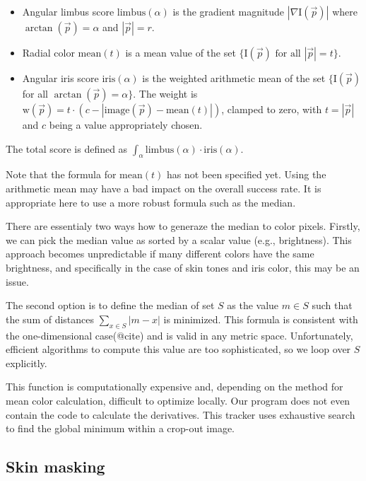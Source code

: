 \begin{itemize}
\item
Angular limbus score $\textrm{limbus}(\alpha)$ is the gradient magnitude $|\nabla \textrm{I}(\vec p)|$ where $\arctan(\vec p) = \alpha$ and $|\vec p| = r$.

\item
Radial color $\textrm{mean}(t)$ is a mean value of the set $\{\textrm{I}(\vec p) \text{ for all } |\vec p| = t \}$.

\item
Angular iris score $\textrm{iris}(\alpha)$ is the weighted arithmetic mean of the set $\{\textrm{I}(\vec p)$ for all $\arctan(\vec p) = \alpha \}$.
The weight is $\textrm{w}(\vec p) = t \cdot (c - |\textrm{image}(\vec p) - \textrm{mean}(t)|)$, clamped to zero, with $t = |\vec p|$ and $c$ being a value appropriately chosen.

\end{itemize}

The total score is defined as $\int_\alpha \textrm{limbus}(\alpha) \cdot \textrm{iris}(\alpha)$.

Note that the formula for $\textrm{mean}(t)$ has not been specified yet.
Using the arithmetic mean may have a bad impact on the overall success rate.
It is appropriate here to use a more robust formula such as the median.

There are essentialy two ways how to generaze the median to color pixels.
Firstly, we can pick the median value as sorted by a scalar value (e.g., brightness).
This approach becomes unpredictable if many different colors have the same brightness, and specifically in the case of skin tones and iris color, this may be an issue.

The second option is to define the median of set $S$ as the value $m \in S$ such that the sum of distances $\sum_{x \in S} |m - x|$ is minimized.
This formula is consistent with the one-dimensional case(@cite) and is valid in any metric space.
Unfortunately, efficient algorithms to compute this value are too sophisticated, so we loop over $S$ explicitly.

This function is computationally expensive and, depending on the method for mean color calculation, difficult to optimize locally.
Our program does not even contain the code to calculate the derivatives.
This tracker uses exhaustive search to find the global minimum within a crop-out image.

\subsection{Skin masking}

